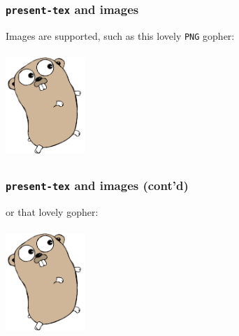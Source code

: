 \documentclass[9pt]{beamer}
\begin{document}
\begin{frame}[fragile]
\frametitle{\texttt{present-tex} and images}



Images are supported, such as this lovely \texttt{PNG} gopher:



\begin{center}
\includegraphics[width=3cm,height=4cm]{_figs/gopher.png}
\end{center}


\end{frame}

\begin{frame}[fragile]
\frametitle{\texttt{present-tex} and images (cont'd)}



or that lovely gopher:



\begin{center}
\includegraphics[width=3cm,height=4cm]{_figs/gopher.png}
\end{center}


\end{frame}
\end{document}
